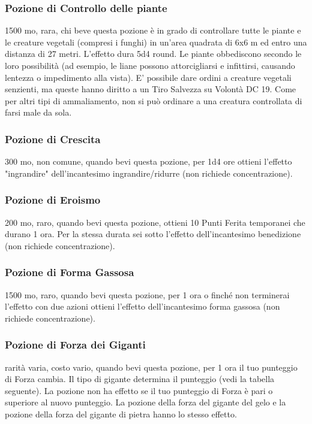 \begin{multicols}{2}
\subsubsection*{Pozione di Controllo delle piante}
1500 mo, rara, chi beve questa pozione è in grado di controllare tutte le piante e le creature vegetali (compresi i funghi) in un’area quadrata di 6x6 m ed entro una distanza di 27 metri. L'effetto dura 5d4 round. Le piante obbediscono secondo le loro possibilità (ad esempio, le liane possono attorcigliarsi e infittirsi, causando lentezza o impedimento alla vista). E' possibile dare ordini a creature vegetali senzienti, ma queste hanno diritto a un Tiro Salvezza su Volontà DC 19. Come per altri tipi di ammaliamento, non si può ordinare a una creatura controllata di farsi male da sola.

\subsubsection*{Pozione di Crescita}
300 mo, non comune, quando bevi questa pozione, per 1d4 ore ottieni l'effetto "ingrandire" dell'incantesimo ingrandire/ridurre (non richiede concentrazione).

\subsubsection*{Pozione di Eroismo}
200 mo, raro, quando bevi questa pozione, ottieni 10 Punti Ferita temporanei che durano 1 ora. Per la stessa durata sei sotto l'effetto dell'incantesimo benedizione (non richiede concentrazione).

\subsubsection*{Pozione di Forma Gassosa}

1500 mo, raro, quando bevi questa pozione, per 1 ora o finché non terminerai l'effetto con due azioni ottieni l'effetto dell'incantesimo forma gassosa (non richiede concentrazione).

\subsubsection*{Pozione di Forza dei Giganti}
rarità varia, costo vario, quando bevi questa pozione, per 1 ora il tuo punteggio di Forza cambia. Il tipo di gigante determina il punteggio (vedi la tabella seguente). La pozione non ha effetto se il tuo punteggio di Forza è pari o superiore al nuovo punteggio. La pozione della forza del gigante del gelo e la pozione della forza del gigante di pietra hanno lo stesso effetto.


\end{multicols}
